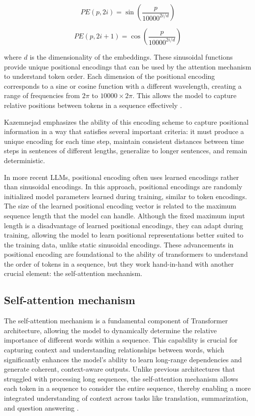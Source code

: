 \begin{equation}
    PE(p, 2i) = \sin\left(\frac{p}{10000^{2i/d}}\right)
\end{equation}

\begin{equation}
PE(p, 2i + 1) = \cos\left(\frac{p}{10000^{2i/d}}\right)
\end{equation}

where \( d \) is the dimensionality of the embeddings. These sinusoidal functions provide unique positional encodings that can be used by the attention mechanism to understand token order. Each dimension of the positional encoding corresponds to a sine or cosine function with a different wavelength, creating a range of frequencies from \( 2\pi \) to \( 10000 \times 2\pi \). This allows the model to capture relative positions between tokens in a sequence effectively \cite{vaswani2017attention}.


Kazemnejad \cite{kazemnejad2019:pencoding} emphasizes the ability of this encoding scheme to capture positional information in a way that satisfies several important criteria: it must produce a unique encoding for each time step, maintain consistent distances between time steps in sentences of different lengths, generalize to longer sentences, and remain deterministic.

In more recent LLMs, positional encoding often uses learned encodings rather than sinusoidal encodings. In this approach, positional encodings are randomly initialized model parameters learned during training, similar to token encodings. The size of the learned positional encoding vector is related to the maximum sequence length that the model can handle. Although the fixed maximum input length is a disadvantage of learned positional encodings, they can adapt during training, allowing the model to learn positional representations better suited to the training data, unlike static sinusoidal encodings. These advancements in positional encoding are foundational to the ability of transformers to understand the order of tokens in a sequence, but they work hand-in-hand with another crucial element: the self-attention mechanism.


\subsection{Self-attention mechanism}

The self-attention mechanism is a fundamental component of Transformer architecture, allowing the model to dynamically determine the relative importance of different words within a sequence. This capability is crucial for capturing context and understanding relationships between words, which significantly enhances the model's ability to learn long-range dependencies and generate coherent, context-aware outputs. Unlike previous architectures that struggled with processing long sequences, the self-attention mechanism allows each token in a sequence to consider the entire sequence, thereby enabling a more integrated understanding of context across tasks like translation, summarization, and question answering \cite{vaswani2017attention}.

